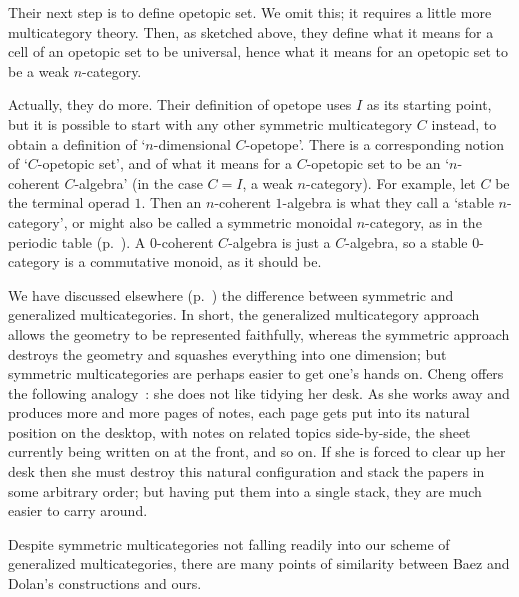 Their next step is to define opetopic set.  We omit this; it
requires a little more multicategory theory.  Then, as sketched above, they
define what it means for a cell of an opetopic set to be universal,
hence what it means for an opetopic set to be a weak $n$-category.

Actually, they do more.  Their definition of opetope uses $I$ as its
starting point, but it is possible to start with any other symmetric
multicategory $C$ instead, to obtain a definition of `$n$-dimensional
$C$-opetope'.%
%
%
 There is a corresponding notion of `$C$-opetopic set',
and of what it means for a $C$-opetopic set to be an `$n$-coherent%
%
%
%
%
$C$-algebra' (in the case $C=I$, a weak $n$-category).  For example, let
$C$ be the terminal operad $1$.  Then an $n$-coherent $1$-algebra is what
they call a `stable%
%
%
%
%
$n$-category', or might also be called a
symmetric monoidal $n$-category, as in the periodic table
(p.~\pageref{p:periodic-table}).  A $0$-coherent $C$-algebra is just a
$C$-algebra, so a stable $0$-category is a commutative monoid, as it should
be.

%
%
We have discussed elsewhere (p.~\pageref{p:sym-discussion}) the difference
between symmetric
and generalized multicategories.  In short, the
generalized multicategory approach allows the geometry to be represented
faithfully, whereas the symmetric approach destroys the geometry and
squashes everything into one dimension; but symmetric multicategories are
perhaps easier to get one's hands on.  Cheng%
%
%
offers the following
analogy~\cite[1.4]{CheWOM}: she does not like tidying her desk.%
%
%
 As she
works away and produces more and more pages of notes, each page gets put
into its natural position on the desktop, with notes on related topics
side-by-side, the sheet currently being written on at the front, and so on.
If she is forced to clear up her desk then she must destroy this natural
configuration and stack the papers in some arbitrary order; but having put
them into a single stack, they are much easier to carry around.

Despite symmetric multicategories not falling readily into our scheme of
generalized multicategories, there are many points of similarity between
Baez and Dolan's constructions and ours.

